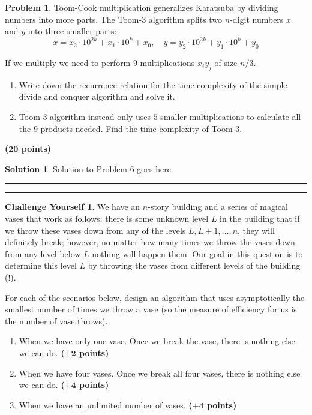 \documentclass{article}
\theoremstyle{definition}
\newtheorem{problem}{Problem}
\newtheorem*{challenge}{Challenge Yourself}
\def\fline{\rule{0.75\linewidth}{0.5pt}}
\newcommand{\finishline}{
  \begin{center}\fline
\end{center}}
\newtheorem*{solution*}{Solution}
\newenvironment{solution}{
\begin{solution*}}{{\finishline}
\end{solution*}}
\newcommand{\grade}[1]{\hfill{\textbf{($\mathbf{#1}$ points)}}}
\begin{document}
  \begin{problem}
    Toom-Cook multiplication generalizes Karatsuba by dividing numbers into more parts. The Toom-3 algorithm splits two $n$-digit numbers $x$ and $y$ into three smaller parts:
    \[
      x = x_2 \cdot 10^{2k} + x_1 \cdot 10^k + x_0, \quad y = y_2 \cdot 10^{2k} + y_1 \cdot 10^k + y_0
    \]

    If we multiply we need to perform $9$  multiplications $x_iy_j$ of size $n/3$.

    \begin{enumerate}
      \item Write down the recurrence relation for the time complexity of the simple divide and conquer algorithm and solve it.

      \item Toom-3 algorithm instead only uses $5$ smaller multiplications to calculate all the $9$ products needed. Find the time complexity of Toom-3.

    \end{enumerate}

  \end{problem}\grade{20}
  \begin{solution}
    Solution to Problem 6 goes here.
  \end{solution}

  \finishline

  \begin{challenge}
    We have an $n$-story building and a series of magical vases that work as follows: there is some unknown level $L$ in the building that if we throw these vases down from any of the levels $L,L+1,\ldots,n$, they will definitely break; however,
    no matter how many times we throw the vases down from any level below $L$ nothing will happen them. Our goal in this question is to determine this level $L$ by throwing the vases from different levels of the building (!).

    For each of the scenarios below, design an algorithm that uses asymptotically the smallest number of times we throw a vase (so the measure of efficiency for us is the number of vase throws).
    \begin{enumerate}
      \item[(a)] When we have only one vase. Once we break the vase, there is nothing else we can do. \grade{+2}

      \item[(b)] When we have  four vases. Once we break all four vases, there is nothing else we can do. \grade{+4}

      \item[(c)] When we have an unlimited number of vases.  \grade{+4}

    \end{enumerate}
  \end{challenge}

  
\end{document}
